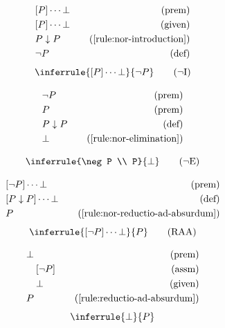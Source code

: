 \begin{align*}
    \premise{[P] \cdots \bot}\\
    \given{[P] \cdots \bot}\\
    \byrule{P \nor P}{\ref{rule:nor-introduction}}\\
    \bydefinition{\neg P}
\end{align*}
\begin{equation}
    \inferrule{[P] \cdots \bot}{\neg P}
    \tag{{$\neg$}I}
    \label{rule:negation-introduction}
\end{equation}

\begin{align*}
    \premise{\neg P}\\
    \premise{P}\\
    \bydefinition{P \nor P}\\
    \byrule{\bot}{\ref{rule:nor-elimination}}
\end{align*}

\begin{equation}
    \inferrule{\neg P \\ P}{\bot}
    \tag{{$\neg$}E}
    \label{rule:negation-elimination}
\end{equation}

\begin{align*}
    \premise{[\neg P] \cdots \bot}\\
    \bydefinition{[P \nor P] \cdots \bot}\\
    \byrule{P}{\ref{rule:nor-reductio-ad-absurdum}}
\end{align*}
\begin{equation}
    \inferrule{[\neg P] \cdots \bot}{P}
    \tag{RAA}
    \label{rule:reductio-ad-absurdum}
\end{equation}

\begin{align*}
    \premise{\bot}\\
    \assumption[1]{\neg P}\\
    \given[1]{\bot}\\
    \byrule{P}{\ref{rule:reductio-ad-absurdum}}
\end{align*}
\begin{equation}
    \inferrule{\bot}{P}
    \label{rule:deductive-explosion}
\end{equation}
